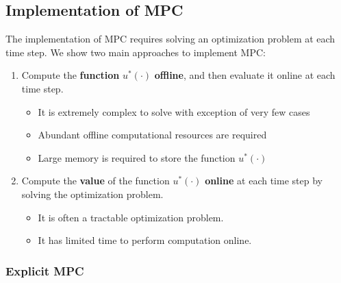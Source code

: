 \subsection{Implementation of MPC}
The implementation of MPC requires solving an optimization problem at each time step. We show two main approaches to implement MPC:
\begin{enumerate}
    \item Compute the \textbf{function} $u^*(\cdot)$ \textbf{offline}, and then evaluate it online at each time step.
    \begin{itemize}
        \item It is extremely complex to solve with exception of very few cases
        \item Abundant offline computational resources are required 
        \item Large memory is required to store the function $u^*(\cdot)$
    \end{itemize}
    \item Compute the \textbf{value} of the function $u^*(\cdot)$ \textbf{online} at each time step by solving the optimization problem.
    \begin{itemize}
        \item It is often a tractable optimization problem.
        \item It has limited time to perform computation online.
    \end{itemize}
\end{enumerate}

\subsubsection{Explicit MPC}

